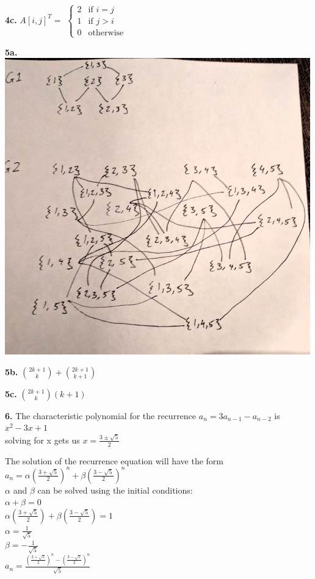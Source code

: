 \documentclass[12pt]{article}
\begin{document}
	\textbf{4c.}
	$ A[i,j]^{T} = $ 
	$\begin{cases} 2  & \mbox{if } i = j  \\  1   & \mbox{if } j>i \\ 0   & \mbox{otherwise} \end{cases}$
	
	\textbf{5a.}\\
    \includegraphics{P5a.jpg}

	\textbf{5b.}	
	$  {2k+1 \choose k} + {2k+1 \choose k+1} $
		
	\textbf{5c.}
	$ {2k+1 \choose k}(k+1)$	
	
	\textbf{6.}
	The characteristic polynomial for the recurrence $ a_{n} = 3a_{n-1} - a_{n-2} $ is $ x^2 - 3x +1 $\\
	solving for x gets us $ x = \frac{3 \pm \sqrt{5}}{2} $
	
	The solution of the recurrence equation will have the form\\
	$ a_{n} = \alpha (\frac{3 + \sqrt{5}}{2})^n + \beta(\frac{3 - \sqrt{5}}{2})^n$ \\
	$\alpha$ and $\beta$ can be solved using the initial conditions:\\
	$ \alpha + \beta = 0 $ \\
	$ \alpha (\frac{3 + \sqrt{5}}{2}) + \beta(\frac{3 - \sqrt{5}}{2}) =1 $\\	
	$ \alpha = \frac{1}{\sqrt{5}} $\\
	$ \beta = -\frac{1}{\sqrt{5}} $\\ 
	$ a_{n} = \frac{(\frac{3 + \sqrt{5}}{2})^n - (\frac{3 - \sqrt{5}}{2})^n}{\sqrt{5} }$
	
\end{document}
